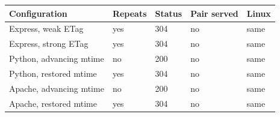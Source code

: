 \begin{tabular}{@{}lllll@{}}
\toprule
Configuration & Repeats & Status & Pair served & Linux \\
\midrule
Express, weak ETag & yes & 304 & no & same \\
Express, strong ETag & yes & 304 & no & same \\
Python, advancing mtime & no & 200 & no & same \\
Python, restored mtime & yes & 304 & no & same \\
Apache, advancing mtime & no & 200 & no & same \\
Apache, restored mtime & yes & 304 & no & same \\
\bottomrule
\end{tabular}
